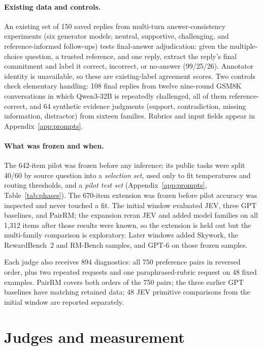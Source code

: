 \documentclass[11pt]{article}
\begin{document}
\paragraph{Existing data and controls.}
An existing set of 150 saved replies from multi-turn answer-consistency experiments (six generator models; neutral, supportive, challenging, and reference-informed follow-ups) tests final-answer adjudication: given the multiple-choice question, a trusted reference, and one reply, extract the reply's final commitment and label it correct, incorrect, or no-answer (99/25/26). Annotator identity is unavailable, so these are existing-label agreement scores. Two controls check elementary handling: 108 final replies from twelve nine-round GSM8K conversations in which Qwen3-32B is repeatedly challenged, all of them reference-correct, and 64 synthetic evidence judgments (support, contradiction, missing information, distractor) from sixteen families. Rubrics and input fields appear in Appendix~\ref{app:prompts}.

\paragraph{What was frozen and when.}
The 642-item pilot was frozen before any inference; its public tasks were split 40/60 by source question into a \emph{selection set}, used only to fit temperatures and routing thresholds, and a \emph{pilot test set} (Appendix~\ref{app:prompts}, Table~\ref{tab:phases}). The 670-item extension was frozen before pilot accuracy was inspected and never touched a fit. The initial window evaluated JEV, three GPT baselines, and PairRM; the expansion reran JEV and added model families on all 1,312 items after those results were known, so the extension is held out but the multi-family comparison is exploratory. Later windows added Skywork, the RewardBench~2 and RM-Bench samples, and GPT-6 on those frozen samples.

Each judge also receives 894 diagnostics: all 750 preference pairs in reversed order, plus two repeated requests and one paraphrased-rubric request on 48 fixed examples. PairRM covers both orders of the 750 pairs; the three earlier GPT baselines have matching retained data; 48 JEV primitive comparisons from the initial window are reported separately.

\section{Judges and measurement}
\label{sec:judges}
\end{document}
